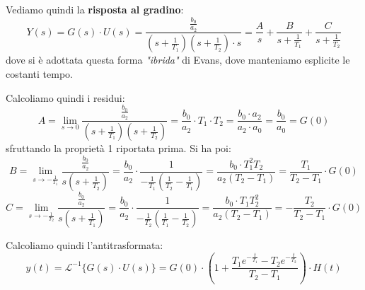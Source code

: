 \documentclass[a4paper,11pt]{article}
\begin{document}
\par\medskip

Vediamo quindi la \textbf{risposta al gradino}:
$$
Y(s) = G(s) \cdot U(s) = \frac{\frac{b_0}{a_2}}{(s + \frac{1}{T_1})(s + \frac{1}{T_2}) \cdot s} = \frac{A}{s} + \frac{B}{s + \frac{1}{T_1}} + \frac{C}{s + \frac{1}{T_2}}
$$
dove si è adottata questa forma \textit{"ibrida"} di Evans, dove manteniamo esplicite le costanti tempo.

Calcoliamo quindi i residui:
$$
A = \lim_{s \rightarrow 0} \frac{\frac{b_0}{a_2}}{(s + \frac{1}{T_1})(s + \frac{1}{T_2})} = \frac{b_0}{a_2} \cdot T_1 \cdot T_2 = \frac{b_0 \cdot a_2}{a_2 \cdot a_0} = \frac{b_0}{a_0} = G(0)
$$
sfruttando la proprietà 1 riportata prima.
Si ha poi:
$$
B = \lim_{s \rightarrow - \frac{1}{T_1}} \frac{\frac{b_0}{a_2}}{s (s + \frac{1}{T_2})} 
= \frac{b_0}{a_2} \cdot \frac{1}{-\frac{1}{T_1} (\frac{1}{T_2} - \frac{1}{T_1})} 
= \frac{b_0 \cdot T_1^2 T_2}{a_2 (T_2 - T_1)} 
= \frac{T_1}{T_2 - T_1} \cdot G(0)
$$
$$
C = \lim_{s \rightarrow - \frac{1}{T_2}} \frac{\frac{b_0}{a_2}}{s (s + \frac{1}{T_1})} 
= \frac{b_0}{a_2} \cdot \frac{1}{-\frac{1}{T_2} (\frac{1}{T_1} - \frac{1}{T_2})} 
= \frac{b_0 \cdot T_1 T_2^2}{a_2 (T_2 - T_1)} 
= -\frac{T_2}{T_2 - T_1} \cdot G(0)
$$

Calcoliamo quindi l'antitrasformata:
$$
y(t) = \mathcal{L}^{-1} \{ G(s) \cdot U(s) \} = G(0) \cdot \left( 1 + \frac{T_1 e^{-\frac{t}{T_1}} - T_2 e^{-\frac{t}{T_2}}}{T_2 - T_1} \right) \cdot H(t)
$$
\end{document}
